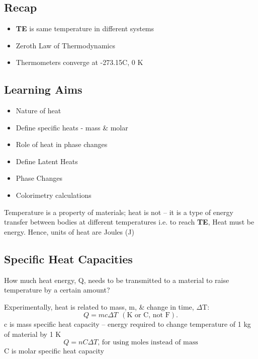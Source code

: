 \documentclass[a4paper, 11pt, normalem]{report}
\begin{document}
\chapter{}
\section{Recap}
\begin{itemize}
    \item \textbf{TE} is same temperature in different systems 
    \item Zeroth Law of Thermodynamics 
    \item Thermometers converge at -273.15{\textdegree}C, 0 K
\end{itemize}

\section{Learning Aims}
\begin{itemize}
    \item Nature of heat
    \item Define specific heats - mass \& molar
    \item Role of heat in phase changes
    \item Define Latent Heats
    \item Phase Changes
    \item Colorimetry calculations
\end{itemize}
Temperature is a property of materials; heat is not -- it is a type of energy transfer between bodies at different temperatures i.e. to reach \textbf{TE},
Heat must be energy. Hence, units of heat are Joules (J)

\section{Specific Heat Capacities}
How much heat energy, Q, needs to be transmitted to a material to raise temperature by a certain amount?

Experimentally, heat is related to mass, m, \& change in time, ${\Delta}$T:
\begin{equation}
    Q = mc{\Delta}T ~~(\text{K or C, not F}).
\end{equation}
c is mass specific heat capacity -- energy required to change temperature of 1 kg of material by 1 K
\begin{equation}
    Q = nC{\Delta}T\text{, for using moles instead of mass}
\end{equation}
C is molar specific heat capacity
\end{document}

